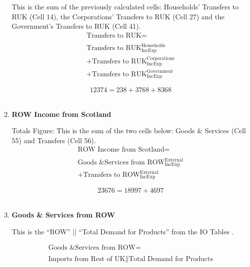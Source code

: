 \begin{enumerate}
This is the sum of the previously calculated cells: Households' Transfers to RUK (Cell 14), the Corporations' Transfers to RUK (Cell 27) and the Government's Transfers to RUK (Cell 41).\\

\begin{equation}
\begin{split}
\text{Transfers to RUK} =  \\ \\
\text{Transfers to RUK}^\text{Households}_\text{IncExp}\\
+\text{Transfers to RUK}^\text{Corporations}_\text{IncExp}\\
+\text{Transfers to RUK}^\text{Government}_\text{IncExp}
\end{split} \label{eq:2.5.57}
\end{equation}

\begin{equation} \nonumber
12374 = 238+3768+8368
\end{equation}\\


\item \textbf {ROW Income from Scotland}

Totals Figure: This is the sum of the two cells below: Goods \& Services (Cell 55) and Transfers (Cell 56).\\

\begin{equation}
\begin{split}
\text{ROW Income from Scotland} =  \\ \\
\text{Goods \& Services from ROW}^\text{External}_\text{IncExp}\\
+\text{Transfers to ROW}^\text{External}_\text{IncExp}
\end{split} \label{eq:2.5.58}
\end{equation}

\begin{equation} \nonumber
23676 = 18997+4697
\end{equation}\\


\item \textbf {Goods \& Services from ROW}

This is the ``ROW'' || ``Total Demand for Products'' from the IO Tables \cite{ScotGov2013a}.

\begin{equation}
\begin{split}
\text{Goods \& Services from ROW} =  \\ \\
\text{Imports from Rest of UK}\|\text{Total Demand for Products}
\end{split} \label{eq:2.5.59}
\end{equation}


\end{enumerate}
